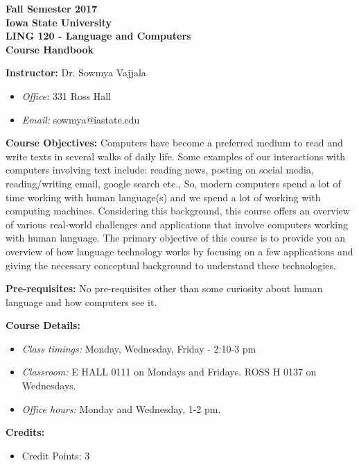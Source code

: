 \documentclass[11pt,a4paper]{article}
\begin{document}
\begin{center}
  \textbf{Fall Semester 2017 \\ Iowa State University\\[3ex]
  {\Large LING 120 - Language and Computers}\\[3ex]
  Course Handbook
}
\end{center}

\bigskip
\textbf{\large Instructor:}
  Dr. Sowmya Vajjala
  \begin{itemize}\vspace*{-.4\baselineskip}\itemsep-.4ex
  \item \textit{Office:} 331 Ross Hall
  \item \textit{Email:} sowmya@iastate.edu
\end{itemize}

\textbf{\large Course Objectives:}
Computers have become a preferred medium to read and write texts in several walks of daily life. Some examples of our interactions with computers involving text include: reading news, posting on social media, reading/writing email, google search etc., So, modern computers spend a lot of time working with human language(s) and we spend a lot of working with computing machines. Considering this background, this course offers an overview of various real-world challenges and applications that involve computers working with human language. The primary objective of this course is to provide you an overview of how language technology works by focusing on a few applications and giving the necessary conceptual background to understand these technologies. 

\textbf{\large Pre-requisites:}
No pre-requisites other than some curiosity about human language and how computers see it. 

\bigskip

\textbf{\large Course Details:}
\begin{itemize}
\item  \textit{Class timings:} Monday, Wednesday, Friday - 2:10-3 pm
\item  \textit{Classroom:} E HALL 0111 on Mondays and Fridays. ROSS H 0137 on Wednesdays. 
\item \textit{Office hours:} Monday and Wednesday, 1-2 pm.
\end{itemize}

\textbf{\large Credits:} 
\begin{itemize}\vspace*{-.8\baselineskip}\itemsep0ex
\item Credit Points: 3
\end{itemize}
\end{document}
